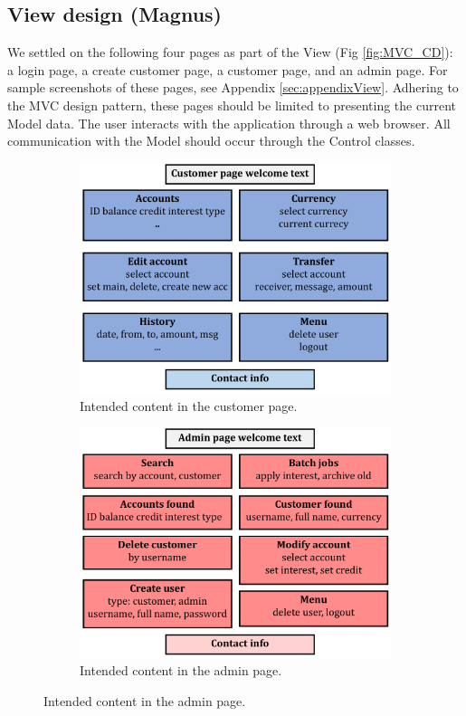 \subsection{View design (Magnus)}\label{sec:viewDesign}

We settled on the following four pages as part of the View (Fig \ref{fig:MVC_CD}): a login page, a create customer page, a customer page, and an admin page. For sample screenshots of these pages, see Appendix \ref{sec:appendixView}. Adhering to the MVC design pattern, these pages should be limited to presenting the current Model data. The user interacts with the application through a web browser. All communication with the Model should occur through the Control classes.

\begin{figure}[H]
\centering

\begin{subfigure}[b]{0.49\textwidth}
\includegraphics[width=\textwidth]{figures/customerPage.pdf}
\caption{Intended content in the customer page.}
\label{fig:customerPageDesign}
\end{subfigure}%
\hfill
\begin{subfigure}[b]{0.49\textwidth}
  \includegraphics[width=\textwidth]{figures/adminPage.pdf}
\caption{Intended content in the admin page.}
\label{fig:adminPageDesign}
\end{subfigure}


\end{figure}
